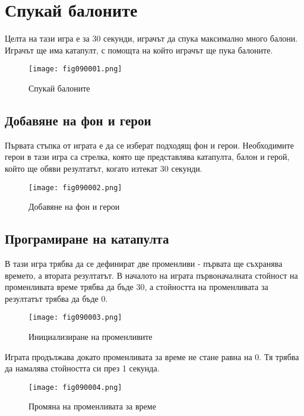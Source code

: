 \chapter{Спукай балоните}

Целта на тази игра е за 30 секунди, играчът да спука максимално много балони. Играчът ще има катапулт, с помощта на който играчът ще пука балоните.

\begin{figure}[H]
  \centering
  \texttt{[image: fig090001.png]}
  \caption{Спукай балоните}
\label{fig090001}
\end{figure}

\section{Добавяне на фон и герои}
Първата стъпка от играта е да се изберат подходящ фон и герои. Необходимите герои в тази игра са стрелка, която ще представлява катапулта, балон и герой, който ще обяви резултатът, когато изтекат 30 секунди.

\begin{figure}[H]
  \centering
  \texttt{[image: fig090002.png]}
  \caption{Добавяне на фон и герои}
\label{fig090002}
\end{figure}

\section{Програмиране на катапулта}
В тази игра трябва да се дефинират две променливи - първата ще съхранява времето, а втората резултатът. В началото на играта първоначалната стойност на променливата време трябва да бъде 30, а стойността на променливата за резултатът трябва да бъде 0.

\begin{figure}[H]
  \centering
  \texttt{[image: fig090003.png]}
  \caption{Инициализиране на променливите}
\label{fig090003}
\end{figure}

Играта продължава докато променливата за време не стане равна на 0. Тя трябва да намалява стойността си през 1 секунда.

\begin{figure}[H]
  \centering
  \texttt{[image: fig090004.png]}
  \caption{Промяна на променливата за време}
\label{fig090004}
\end{figure}

